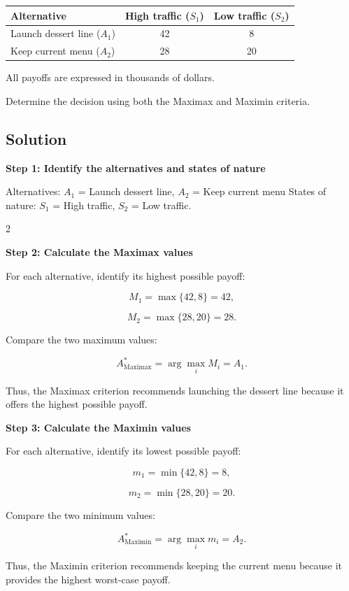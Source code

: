 	\begin{center}
		\renewcommand{\arraystretch}{1.3}
		\begin{tabular}{lcc}
			\toprule
			Alternative & High traffic ($S_1$) & Low traffic ($S_2$) \\
			\midrule
			Launch dessert line ($A_1$) & 42 & 8 \\
			Keep current menu ($A_2$) & 28 & 20 \\
			\bottomrule
		\end{tabular}
	\end{center}
	
	All payoffs are expressed in thousands of dollars.
	
	Determine the decision using both the Maximax and Maximin criteria.
	
	
	\subsection{Solution}
	
	\textbf{Step 1: Identify the alternatives and states of nature}
	
	Alternatives: $A_1$ = Launch dessert line, $A_2$ = Keep current menu
	\qquad
	States of nature: $S_1$ = High traffic, $S_2$ = Low traffic.
	
	\noindent
	\setlength{\columnseprule}{0.4pt}
	
	\begin{multicols}{2}
		\vspace{0pt}
		
		\textbf{Step 2: Calculate the Maximax values}
		
		For each alternative, identify its highest possible payoff:
		
		\[
		M_1
		=
		\max\{42,8\}
		=
		42,
		\]
		
		\[
		M_2
		=
		\max\{28,20\}
		=
		28.
		\]
		
		Compare the two maximum values:
		
		\[
		A^*_{\mathrm{Maximax}}
		=
		\arg\max_i M_i
		=
		A_1.
		\]
		
		Thus, the Maximax criterion recommends launching the dessert line because it offers the highest possible payoff.
		
		\columnbreak
		
		\textbf{Step 3: Calculate the Maximin values}
		
		For each alternative, identify its lowest possible payoff:
		
		\[
		m_1
		=
		\min\{42,8\}
		=
		8,
		\]
		
		\[
		m_2
		=
		\min\{28,20\}
		=
		20.
		\]
		
		Compare the two minimum values:
		
		\[
		A^*_{\mathrm{Maximin}}
		=
		\arg\max_i m_i
		=
		A_2.
		\]
		
		Thus, the Maximin criterion recommends keeping the current menu because it provides the highest worst-case payoff.
		
	\end{multicols}
	
